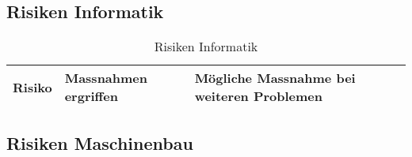 \documentclass[../../main.tex]{subfiles}
\begin{document}
    \subsection{Risiken Informatik}
    \begin{table}[H]
        \begin{tabular}{|p{}|p{}|p{}|}
    \hline
    \textbf{Risiko}          & \textbf{Massnahmen ergriffen}                                                                                       & \textbf{Mögliche Massnahme bei weiteren Problemen} \\ \hline
    \end{tabular}
    \caption{Risiken Informatik}
    \label{tab:risk_I}
    \end{table}

    \subsection{Risiken Maschinenbau}
\end{document}
